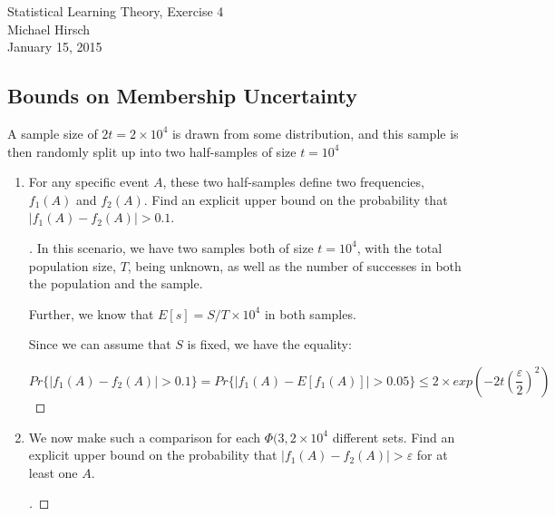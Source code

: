 \documentclass[]{book}
\theoremstyle{definition}
\begin{document}
\begin{center}
{\Large Statistical Learning Theory, Exercise 4}\\
Michael Hirsch\\ %
January 15, 2015 %
\end{center}

\vspace{0.2 cm}


\subsection*{Bounds on Membership Uncertainty}

A sample size of $2t = 2 \times 10^{4}$ is drawn from some distribution, and this sample is then randomly split up into two half-samples of size $t = 10^{4}$


\begin{enumerate}
\item\label{norms}

For any specific event $A$, these two half-samples define two frequencies, $f_{1}(A)$ and $f_{2}(A)$. Find an explicit upper bound on the probability that $|f_{1}(A) - f_{2}(A)| > 0.1$.

\begin{proof}[\unskip\nopunct]

In this scenario, we have two samples both of size $t = 10^{4}$, with the total population size, $T$, being unknown, as well as the number of successes in both the population and the sample. 

Further, we know that $E[s] = S/T \times 10^{4}$ in both samples.

Since we can assume that $S$ is fixed, we have the equality:

$$Pr\{|f_{1}(A) - f_{2}(A)| > 0.1\} = Pr\{|f_{1}(A) - E[f_{1}(A)]| > 0.05\} \leq 2 \times exp(-2t(\dfrac{\varepsilon}{2})^{2})$$

\end{proof}

\item

We now make such a comparison for each $\Phi(3,2 \times 10^{4}$ different sets. Find an explicit upper bound on the probability that $|f_{1}(A) - f_{2}(A)| > \varepsilon$ for at least one $A$.

\begin{proof}[\unskip\nopunct]

\end{proof}


\end{enumerate}
\end{document}
